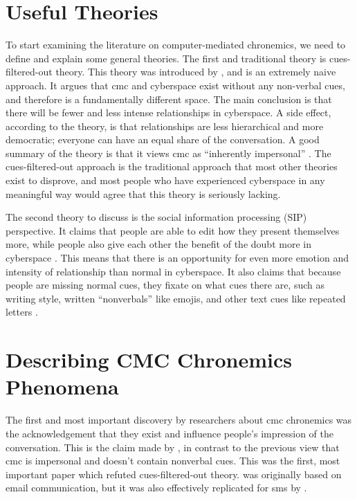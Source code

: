 \documentclass[
  stu]{apa7}
\begin{document}
\hypertarget{useful-theories}{%
\section{Useful Theories}\label{useful-theories}}

To start examining the literature on computer-mediated chronemics, we
need to define and explain some general theories. The first and
traditional theory is cues-filtered-out theory. This theory was
introduced by \textcite{sproull91}, and is an extremely naive approach.
It argues that cmc and cyberspace exist without any non-verbal cues, and
therefore is a fundamentally different space. The main conclusion is
that there will be fewer and less intense relationships in cyberspace. A
side effect, according to the theory, is that relationships are less
hierarchical and more democratic; everyone can have an equal share of
the conversation. A good summary of the theory is that it views cmc as
``inherently impersonal'' \autocite[ 16]{kim05}. The cues-filtered-out
approach is the traditional approach that most other theories exist to
disprove, and most people who have experienced cyberspace in any
meaningful way would agree that this theory is seriously lacking.

The second theory to discuss is the social information processing (SIP)
perspective. It claims that people are able to edit how they present
themselves more, while people also give each other the benefit of the
doubt more in cyberspace \autocite{kim05}. This means that there is an
opportunity for even more emotion and intensity of relationship than
normal in cyberspace. It also claims that because people are missing
normal cues, they fixate on what cues there are, such as writing style,
written ``nonverbals'' like emojis, and other text cues like repeated
letters \autocite{kim05}.

\hypertarget{describing-cmc-chronemics-phenomena}{%
\section{Describing CMC Chronemics
Phenomena}\label{describing-cmc-chronemics-phenomena}}

The first and most important discovery by researchers about cmc
chronemics was the acknowledgement that they exist and influence
people's impression of the conversation. This is the claim made by
\textcite{walther95}, in contrast to the previous view that cmc is
impersonal and doesn't contain nonverbal cues. This was the first, most
important paper which refuted cues-filtered-out theory.
\textcite{walther95} was originally based on email communication, but it
was also effectively replicated for sms by \textcite{doring09}.
\end{document}

